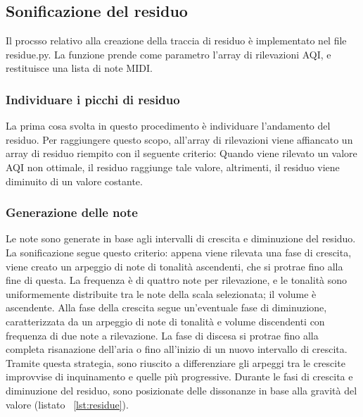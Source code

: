 \newpage

\subsection{Sonificazione del residuo}
Il procsso relativo alla creazione della traccia di residuo è implementato nel file residue.py.
La funzione prende come parametro l'array di rilevazioni AQI, e restituisce una lista di note MIDI.
\subsubsection{Individuare i picchi di residuo}
La prima cosa svolta in questo procedimento è individuare l'andamento del residuo.
Per raggiungere questo scopo, all'array di rilevazioni viene affiancato un array di residuo riempito con il seguente criterio:
Quando viene rilevato un valore AQI non ottimale, il residuo raggiunge tale valore, altrimenti, il residuo viene diminuito di un valore costante.
\subsubsection{Generazione delle note}
Le note sono generate in base agli intervalli di crescita e diminuzione del residuo.
La sonificazione segue questo criterio: appena viene rilevata una fase di crescita, viene creato un arpeggio di note di tonalità ascendenti, che si protrae fino alla fine di questa.
La frequenza è di quattro note per rilevazione, e le tonalità sono uniformemente distribuite tra le note della scala selezionata; il volume è ascendente.
Alla fase della crescita segue un'eventuale fase di diminuzione, caratterizzata da un arpeggio di note di tonalità e volume discendenti con frequenza di due note a rilevazione. La fase
di discesa si protrae fino alla completa risanazione dell'aria o fino all'inizio di un nuovo intervallo di crescita.
Tramite questa strategia, sono riuscito a differenziare gli arpeggi tra le crescite improvvise di inquinamento e quelle più progressive.
Durante le fasi di crescita e diminuzione del residuo, sono posizionate delle dissonanze in base alla gravità del valore (listato ~\ref{lst:residue}).

\newpage


